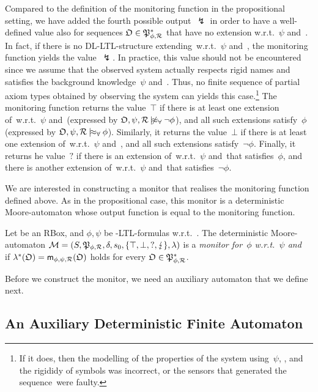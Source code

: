 \noindent
Compared to the definition of the monitoring function in the propositional
setting, we have added the fourth possible output~$\lightning$ in order to have
a well-defined value also for sequences $\mathfrak{O}\in\mathfrak{P}_{\phi,\mathcal{R}}^*$ that have no
extension w.r.t.~$\psi$ and~\Rmc.  In fact, if there is no DL-LTL-structure
extending~\Omf w.r.t.~$\psi$ and~\Rmc, the monitoring function yields the
value~$\lightning$.  In practice, this value should not be encountered since we
assume that the observed system actually respects rigid names and satisfies the
background knowledge~$\psi$ and~\Rmc.  Thus, no finite sequence of partial axiom
types obtained by observing the system can yields this case.\footnote{%
    If it does, then the modelling of the properties of the system
    using~$\psi$, \Rmc, and the rigididy of symbols was incorrect, or the
    sensors that generated the sequence~\Omf were faulty.}
%
The monitoring function returns the value~$\top$ if there is at least one
extension of~\Omf w.r.t.~$\psi$ and~\Rmc (expressed by
$\Omf,\psi,\Rmc\notmodelsal\lnot\phi$), and all such extensions satisfy~$\phi$
(expressed by $\Omf,\psi,\Rmc\modelsal\phi$).  Similarly, it returns the
value~$\bot$ if there is at least one extension of~\Omf w.r.t.~$\psi$ and~\Rmc,
and all such extensions satisfy~$\lnot\phi$.  Finally, it returns he value~${?}$
if there is an extension of~\Omf w.r.t.~$\psi$ and~\Rmc that satisfies~$\phi$,
and there is another extension of~\Omf w.r.t.~$\psi$ and~\Rmc that
satisfies~$\lnot\phi$.

We are interested in constructing a monitor that realises the monitoring
function defined above.  As in the propositional case, this monitor is a
deterministic Moore-automaton whose output function is equal to the monitoring
function.

\begin{definition}\label{def:monitor-shoq-ltl}
    Let \Rmc be an RBox, and $\phi,\psi$ be \SHOQ-LTL-formulas w.r.t.~\Rmc.  The
    deterministic Moore-automaton
    $\mathcal{M}=(S,\mathfrak{P}_{\phi,\mathcal{R}},\delta,s_0,\{\top,\bot,{?},\lightning\},\lambda)$
    is a \emph{monitor for~$\phi$ w.r.t.~$\psi$ and~\Rmc} if
    $\lambda^*(\mathfrak{O})=\mathsf{m}_{\phi,\psi,\mathcal{R}}(\mathfrak{O})$ holds for every
    $\mathfrak{O}\in\mathfrak{P}_{\phi,\mathcal{R}}^*$.
\end{definition}

\noindent
Before we construct the monitor, we need an auxiliary automaton that we define
next.


\subsection{An Auxiliary Deterministic Finite Automaton}\label{sec:aux-dfa}

